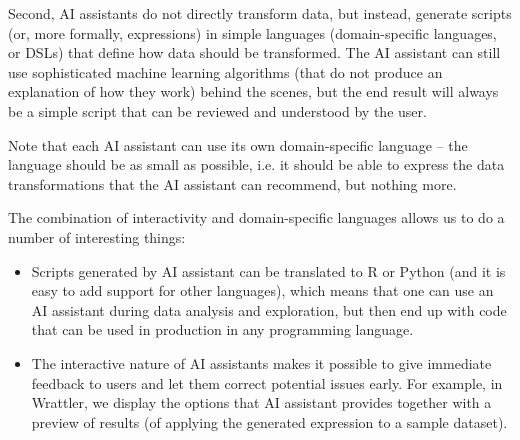 \documentclass{article}
\begin{document}
Second, AI assistants do not directly transform data, but instead, generate scripts (or, more 
formally, expressions) in simple languages (domain-specific languages, or DSLs) that define how 
data should be transformed. The AI assistant can still use sophisticated machine learning 
algorithms (that do not produce an explanation of how they work) behind the scenes, but the end
result will always be a simple script that can be reviewed and understood by the user.

Note that each AI assistant can use its own domain-specific language -- the language should be
as small as possible, i.e. it should be able to express the data transformations that the AI
assistant can recommend, but nothing more.

The combination of interactivity and domain-specific languages allows us to do a number of 
interesting things:

\begin{itemize}
\item Scripts generated by AI assistant can be translated to R or Python (and it is easy to 
  add support for other languages), which means that one can use an AI assistant during data
  analysis and exploration, but then end up with code that can be used in production in any
  programming language.

\item The interactive nature of AI assistants makes it possible to give immediate feedback to
  users and let them correct potential issues early. For example, in Wrattler, we display the
  options that AI assistant provides together with a preview of results (of applying the
  generated expression to a sample dataset). 
\end{itemize}
\end{document}
